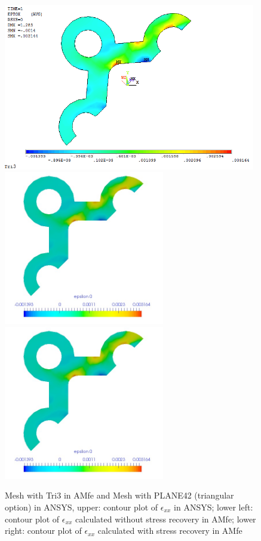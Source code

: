 \begin{figure}[htbp]
	\begin{center}
		\includegraphics[width=11cm,clip]{TTri3_Exx.png} 	
		\includegraphics[width=7cm,clip]{TTri3_Exx_PD.png} 	
		\includegraphics[width=7cm,clip]{TTri3_Exx_P.png} 	
		\caption{Mesh with Tri3 in AMfe and Mesh with PLANE42 (triangular option) in ANSYS, upper: contour plot of $\epsilon_{xx}$ in ANSYS; lower left: contour plot of $\epsilon_{xx}$ calculated without stress recovery in AMfe; lower right: contour plot of $\epsilon_{xx}$ calculated with stress recovery in AMfe} \label{fig: Tri3_Exx}
	\end{center}
\end{figure}
\clearpage 

